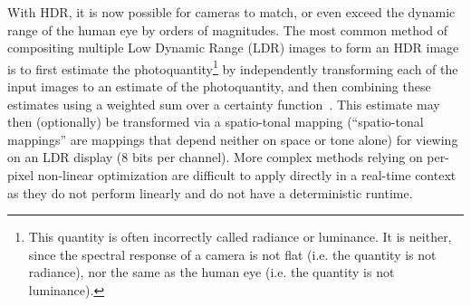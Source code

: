 With HDR, it is now possible for cameras to match, or even exceed the dynamic range of the human 
eye by orders of magnitudes. The most common method of compositing multiple Low Dynamic 
Range (LDR) images to form an HDR image is to first estimate the photoquantity\footnote{This 
quantity is often incorrectly called radiance or luminance. It is neither, since the spectral response of 
a camera is not flat (i.e. the quantity is not radiance), nor the same as the human eye (i.e. the 
quantity is not luminance).}  by independently transforming each of the input images to an estimate of 
the photoquantity, and then combining these estimates using a weighted sum over a certainty 
function~\cite{mannist, mannwyckofftr, comparam, intelligentimageprocessing}.
This estimate may then (optionally) be transformed via a spatio-tonal mapping (``spatio-tonal 
mappings'' are mappings that depend neither on space or tone alone) for viewing on an LDR display 
(8 bits per channel).  More complex methods relying on per-pixel non-linear optimization are difficult 
to apply directly in a real-time context~\cite{pal2004probability, kang2003high, granados2010optimal} 
as they do not perform linearly and do not have a deterministic runtime.

